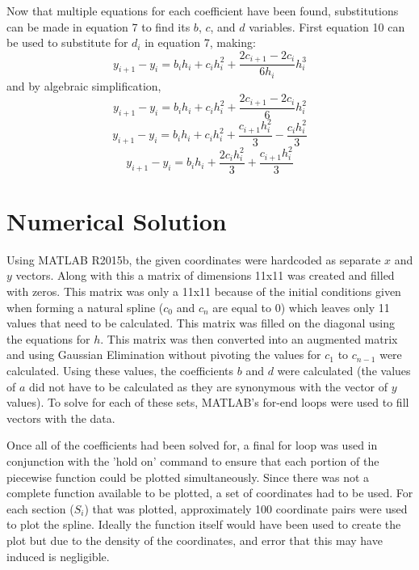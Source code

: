 \documentclass[12pt, letterpaper]{article} %
\begin{document}
Now that multiple equations for each coefficient have been found, substitutions can be made in equation 7 to find its \(b\), \(c\), and \(d\) variables. First equation 10 can be used to substitute for \(d_i\) in equation 7, making:
\begin{equation}
y_{i + 1} - y_i = b_ih_i + c_ih_i^2 + \dfrac{2c_{i + 1} - 2c_i}{6h_i}h_i^3
\end{equation}
and by algebraic simplification,
\begin{equation}
y_{i + 1} - y_i = b_ih_i + c_ih_i^2 + \dfrac{2c_{i + 1} - 2c_i}{6}h_i^2
\end{equation}
\begin{equation}
y_{i + 1} - y_i = b_ih_i + c_ih_i^2 + \dfrac{c_{i + 1}h_i^2}{3} - \dfrac{c_ih_i^2}{3}
\end{equation}
\begin{equation}
y_{i + 1} - y_i = b_ih_i + \dfrac{2c_ih_i^2}{3} + \dfrac{c_{i + 1}h_i^2}{3}
\end{equation}



\section*{Numerical Solution}
Using MATLAB R2015b, the given coordinates were hardcoded as separate $x$ and $y$ vectors. Along with this a matrix of dimensions 11x11 was created and filled with zeros. This matrix was only a 11x11 because of the initial conditions given when forming a natural spline ($c_0$ and $c_n$ are equal to 0) which leaves only 11 values that need to be calculated. This matrix was filled on the diagonal using the equations for $h$. This matrix was then converted into an augmented matrix and using Gaussian Elimination without pivoting the values for $c_1$ to $c_{n-1}$ were calculated. Using these values, the coefficients $b$ and $d$ were calculated (the values of $a$ did not have to be calculated as they are synonymous with the vector of $y$ values). To solve for each of these sets, MATLAB's for-end loops were used to fill vectors with the data. 

Once all of the coefficients had been solved for, a final for loop was used in conjunction with the 'hold on' command to ensure that each portion of the piecewise function could be plotted simultaneously. Since there was not a complete function available to be plotted, a set of coordinates had to be used. For each section ($S_i$) that was plotted, approximately 100 coordinate pairs were used to plot the spline. Ideally the function itself would have been used to create the plot but due to the density of the coordinates, and error that this may have induced is negligible. 
\end{document}
